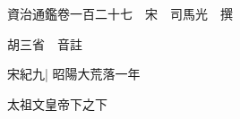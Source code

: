 






























































資治通鑑卷一百二十七　宋　司馬光　撰

胡三省　音註

宋紀九|{
	昭陽大荒落一年}


太祖文皇帝下之下

